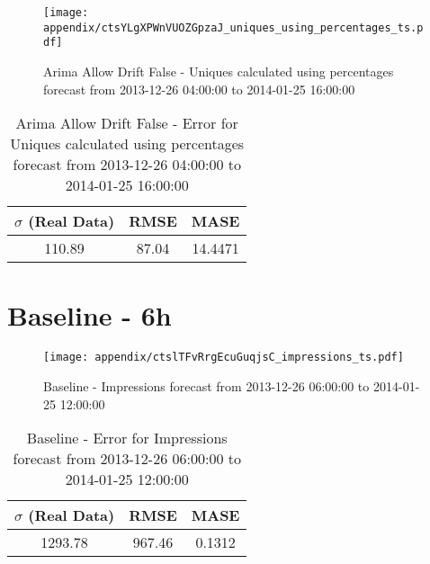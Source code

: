 \begin{figure}[H] \begin{center} \leavevmode
\texttt{[image: appendix/ctsYLgXPWnVUOZGpzaJ\_uniques\_using\_percentages\_ts.pdf]} \caption{
Arima Allow Drift False - Uniques calculated using percentages forecast from 2013-12-26 04:00:00 to 2014-01-25 16:00:00} \label{fig:appendix/ctsYLgXPWnVUOZGpzaJ_uniques_using_percentages_ts.pdf} \end{center}
\end{figure}

\begin{table}[H]
\centering
\footnotesize
\begin{tabular}{ccc}
$\sigma$ (Real Data) & RMSE & MASE   \\ \hline
110.89 & 87.04 & 14.4471 \\
\end{tabular}

\vspace{0.5cm}

\caption{
Arima Allow Drift False - Error for Uniques calculated using percentages forecast from 2013-12-26 04:00:00 to 2014-01-25 16:00:00}
\end{table}

\section{Baseline - 6h}
\begin{figure}[H] \begin{center} \leavevmode
\texttt{[image: appendix/ctslTFvRrgEcuGuqjsC\_impressions\_ts.pdf]} \caption{
Baseline - Impressions forecast from 2013-12-26 06:00:00 to 2014-01-25 12:00:00} \label{fig:appendix/ctslTFvRrgEcuGuqjsC_impressions_ts.pdf} \end{center}
\end{figure}

\begin{table}[H]
\centering
\footnotesize
\begin{tabular}{ccc}
$\sigma$ (Real Data) & RMSE & MASE   \\ \hline
1293.78 & 967.46 & 0.1312 \\
\end{tabular}

\vspace{0.5cm}

\caption{
Baseline - Error for Impressions forecast from 2013-12-26 06:00:00 to 2014-01-25 12:00:00}
\end{table}

